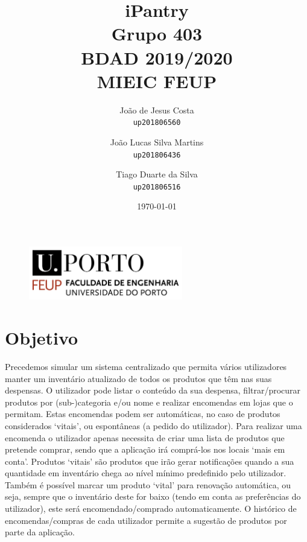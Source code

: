\documentclass{report}
\begin{document}
\title{\huge{\textbf{iPantry}} \\ Grupo 403 \\ BDAD 2019/2020 \\ MIEIC FEUP}
\author{João de Jesus Costa \\ \texttt{up201806560} \and
	João Lucas Silva Martins \\ \texttt{up201806436} \and
	Tiago Duarte da Silva \\ \texttt{up201806516}}
\date{\today{}}

\begin{figure}[b]
	\centering
	\includegraphics[width=0.6\textwidth]{feup_logo.png}
\end{figure}
\maketitle{}

\tableofcontents{}
\newpage

\newcommand{\foreign}[2] {$\hbox{#1} \rightarrow \hbox{#2}$}

\newcommand{\foreignkey}[2] {$\hbox{\underline{#1}} \rightarrow \hbox{#2}$}

\chapter{Objetivo}
Precedemos simular um sistema centralizado que permita vários utilizadores manter
um inventário atualizado de todos os produtos que têm nas suas despensas.
\newline
O utilizador pode listar o conteúdo da sua despensa, filtrar/procurar produtos por
(sub-)categoria e/ou nome e realizar encomendas em lojas que o permitam. Estas
encomendas podem ser automáticas, no caso de produtos considerados `vitais', ou
espontâneas (a pedido do utilizador). Para realizar uma encomenda o utilizador
apenas necessita de criar uma lista de produtos que pretende comprar, sendo que
a aplicação irá comprá-los nos locais `mais em conta'.
\newline
Produtos `vitais' são produtos que irão gerar notificações quando a sua quantidade
em inventário chega ao nível mínimo predefinido pelo utilizador. Também é possível
marcar um produto `vital' para renovação automática, ou seja, sempre que o inventário
deste for baixo (tendo em conta as preferências do utilizador), este será
encomendado/comprado automaticamente.
\newline
O histórico de encomendas/compras de cada utilizador permite a sugestão de produtos
por parte da aplicação.
\end{document}
